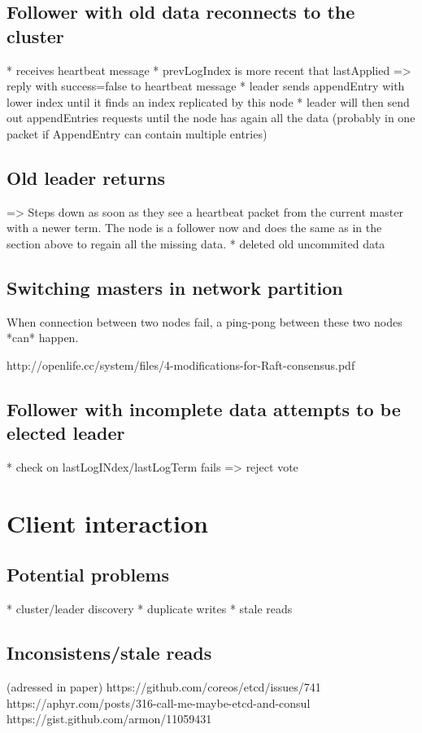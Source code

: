 \subsection{Follower with old data reconnects to the cluster}
* receives heartbeat message
* prevLogIndex is more recent that lastApplied => reply with success=false to heartbeat message
* leader sends appendEntry with lower index until it finds an index replicated by this node
* leader will then send out appendEntries requests until the node has again all the data (probably in one packet if AppendEntry can contain multiple entries)

\subsection{Old leader returns}
=> Steps down as soon as they see a heartbeat packet from the current master with a newer term.
The node is a follower now and does the same as in the section above to regain all the missing data.
* deleted old uncommited data

\subsection{Switching masters in network partition}
When connection between two nodes fail, a ping-pong between these two nodes *can* happen.

http://openlife.cc/system/files/4-modifications-for-Raft-consensus.pdf

\subsection{Follower with incomplete data attempts to be elected leader}
* check on lastLogINdex/lastLogTerm fails => reject vote

\section{Client interaction}

\subsection{Potential problems}
* cluster/leader discovery
* duplicate writes
* stale reads

\subsection{Inconsistens/stale reads}
(adressed in paper)
https://github.com/coreos/etcd/issues/741
https://aphyr.com/posts/316-call-me-maybe-etcd-and-consul
https://gist.github.com/armon/11059431

